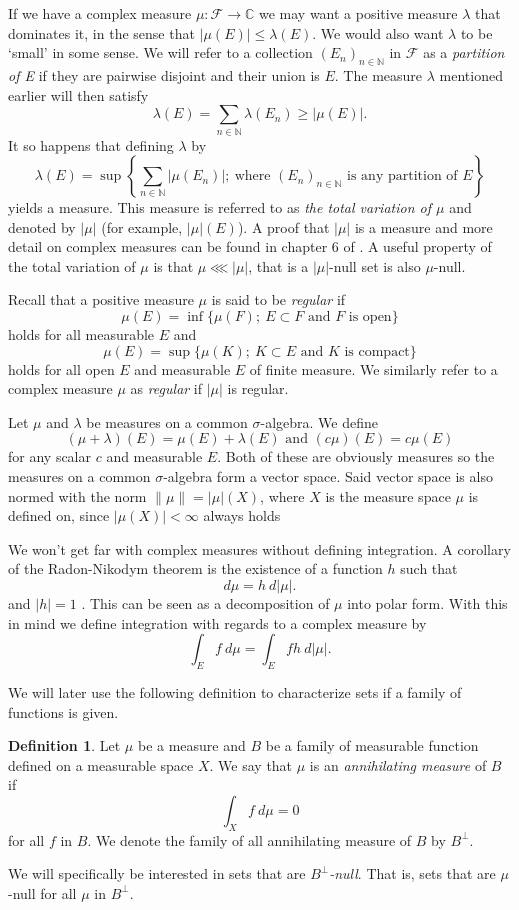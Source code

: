 \documentclass[a4paper,12pt,twoside,BCOR=10mm]{scrbook}
\theoremstyle{definition}
\theoremstyle{definition}
\theoremstyle{definition}
\newtheorem{definition}[theorem]{Definition}
\begin{document}
If we have a complex measure $\mu: \mathcal{F} \rightarrow \mathbb{C}$ we may want a positive measure $\lambda$ that dominates it, in the sense that $|\mu(E)| \leq \lambda(E)$.
We would also want $\lambda$ to be `small' in some sense.
We will refer to a collection $(E_n)_{n \in \mathbb{N}}$ in $\mathcal{F}$ as a \emph{partition of E} if they are pairwise disjoint and their union is $E$.
The measure $\lambda$ mentioned earlier will then satisfy
\[
	\lambda(E) = \sum_{n \in \mathbb{N}} \lambda(E_n) \geq |\mu(E)|.
\]
It so happens that defining $\lambda$ by
\[
	\lambda(E) = \sup \left \{\sum_{n \in \mathbb{N}}|\mu(E_n)|;\ \text{where }(E_n)_{n \in \mathbb{N}}\text{ is any partition of }E \right \}
\]
yields a measure.
This measure is referred to as \emph{\label{index2} the total variation of $\mu$} and denoted by $|\mu|$ (for example, $|\mu|(E)$).
A proof that $|\mu|$ is a measure and more detail on complex measures can be found in chapter $6$ of \citep{rudin2}. 
A useful property of the total variation of $\mu$ is that $\mu \lll |\mu|$, that is a $|\mu|$-null set is also $\mu$-null.

\label{index20}
Recall that a positive measure $\mu$ is said to be \emph{regular} if
\[
	\mu(E) = \inf\{\mu(F);\ E \subset F \text{ and $F$ is open}\}
\]
holds for all measurable $E$ and
\[
	\mu(E) = \sup\{\mu(K);\ K \subset E \text{ and $K$ is compact}\}
\]
holds for all open $E$ and measurable $E$ of finite measure.
We similarly refer to a complex measure $\mu$ as \emph{regular} if $|\mu|$ is regular.

Let $\mu$ and $\lambda$ be measures on a common $\sigma$-algebra.
We define
\[
	(\mu + \lambda)(E) = \mu(E) + \lambda(E) \text{ and } (c\mu)(E) = c\mu(E)
\]
for any scalar $c$ and measurable $E$.
Both of these are obviously measures so the measures on a common $\sigma$-algebra form a vector space.
Said vector space is also normed with the norm \label{index3} $\|\mu\| = |\mu|(X)$, where $X$ is the measure space $\mu$ is defined on, since $|\mu(X)| < \infty$ always holds \citep[Theorem $6.4$]{rudin2}

We won't get far with complex measures without defining integration.
A corollary of the Radon-Nikodym theorem is the existence of a function $h$ such that
\[
	d\mu = h\ d|\mu|.
\]
and $|h| = 1$ \citep[Theorem $6.12$]{rudin2}.
This can be seen as a decomposition of $\mu$ into polar form.
With this in mind we define integration with regards to a complex measure by
\[
	\int_E f\ d\mu = \int_E fh\ d|\mu|.
\]

We will later use the following definition to characterize sets if a family of functions is given.
\begin{definition}
\label{annilatingmeasure}
Let $\mu$ be a measure and $B$ be a family of measurable function defined on a measurable space $X$.
We say that $\mu$ is an \emph{annihilating measure} of $B$ if
\[
	\int_X f\ d\mu = 0
\]
for all $f$ in $B$. We denote the family of all annihilating measure of $B$ by $B^{\bot}$.
\end{definition}
We will specifically be interested in sets that are \emph{$B^{\bot}$-null}.
That is, sets that are $\mu$-null for all $\mu$ in $B^{\bot}$. 
\end{document}
